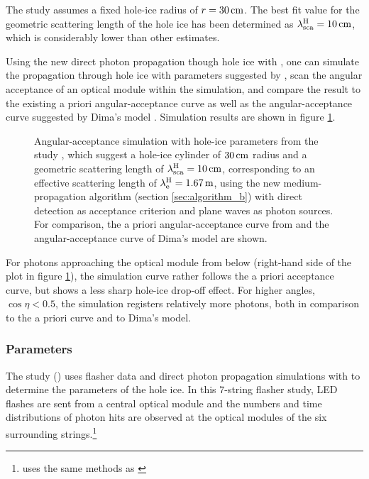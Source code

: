 The  study assumes a fixed hole-ice radius of \(r=30\text{\,cm}\).
The best fit value for the geometric scattering length of the hole ice
has been determined as \(\lambda^\text{H}_\text{sca} = 10\text{\,cm}\), which is considerably
lower than other estimates. \cite{martindardupdate}

Using the new direct photon propagation though hole ice with \clsim, one
can simulate the propagation through hole ice with parameters suggested
by , scan the angular acceptance of an optical module within
the simulation, and compare the result to the existing a priori
angular-acceptance curve \cite{icepaper} as well as the
angular-acceptance curve suggested by Dima's model
\cite{flasherdataderivedicemodels}. Simulation results are shown in
figure \ref{fig:eePai1sh}.


\begin{figure}[htbp]
  \caption{Angular-acceptance simulation with hole-ice parameters from the  study \cite{martindardupdate}, which suggest a hole-ice cylinder of $30\text{\,cm}$ radius and a geometric scattering length of $\lambda_\text{sca}^\text{H} = 10\text{\,cm}$, corresponding to an effective scattering length of $\lambda^\text{H}_\text{e} = 1.67\text{\,m}$, using the new medium-propagation algorithm (section \ref{sec:algorithm_b}) with direct detection as acceptance criterion and plane waves as photon sources. For comparison, the a priori angular-acceptance curve from \cite{icepaper} and the angular-acceptance curve of Dima's model \cite{flasherdataderivedicemodels} are shown.}
  \label{fig:eePai1sh}
\end{figure}

For photons approaching the optical module from below (right-hand side
of the plot in figure \ref{fig:eePai1sh}), the simulation curve rather
follows the a priori acceptance curve, but shows a less sharp hole-ice
drop-off effect. For higher angles, \(\cos\eta < 0.5\), the simulation
registers relatively more photons, both in comparison to the a priori
curve and to Dima's model.

\subsubsection{ Parameters}
\label{sec:spicehd_parameters}

The  study
()
uses flasher data and direct photon propagation simulations with \ppc to
determine the parameters of the hole ice. In this 7-string flasher
study, LED flashes are sent from a central optical module and the
numbers and time distributions of photon hits are observed at the
optical modules of the six surrounding
strings.\footnote{ uses the same methods as \cite{icepaper,dimaslikelihood}}

